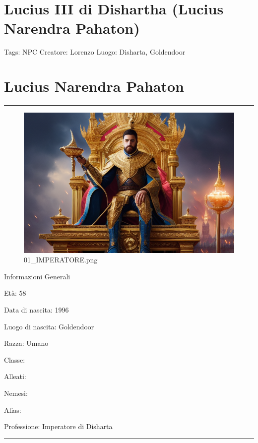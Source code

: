 \section{Lucius III di Dishartha (Lucius Narendra
Pahaton)}\label{lucius-iii-di-dishartha-lucius-narendra-pahaton}

Tags: NPC Creatore: Lorenzo Luogo: Disharta, Goldendoor

\section{\texorpdfstring{\textbf{Lucius Narendra
Pahaton}}{Lucius Narendra Pahaton}}\label{lucius-narendra-pahaton}

\begin{center}\rule{0.5\linewidth}{0.5pt}\end{center}

\begin{figure}
\centering
\includegraphics{01_IMPERATORE.png}
\caption{01\_IMPERATORE.png}
\end{figure}

Informazioni Generali

Età: 58

Data di nascita: 1996

Luogo di nascita: Goldendoor

Razza: Umano

Classe:

Alleati:

Nemesi:

Alias:

Professione: Imperatore di Disharta

\begin{center}\rule{0.5\linewidth}{0.5pt}\end{center}

